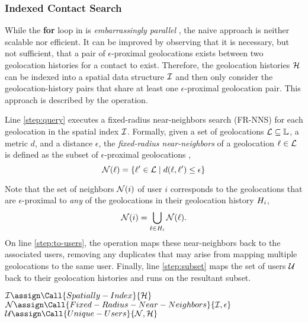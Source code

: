 \subsubsection{Indexed Contact Search}
While the \textbf{for} loop in  is \emph{embarrassingly parallel} \cite[p. 14]{Herlihy2012}, the naive approach is neither scalable nor efficient. It can be improved by observing that it is necessary, but not sufficient, that a pair of $\epsilon$\hyp{}proximal geolocations exists between two geolocation histories for a contact to exist. Therefore, the geolocation histories $\mathcal{H}$ can be indexed into a spatial data structure $\mathcal{I}$ \cite{Mokbel2003, Dinh2010, Mahmood2019} and then only consider the geolocation\hyp{}history pairs that share at least one $\epsilon$\hyp{}proximal geolocation pair. This approach is described by the  operation.

Line \ref{step:query} executes a fixed\hyp{}radius near\hyp{}neighbors search (FR-NNS) \cite{Bentley1975, Brin1995} for each geolocation in the spatial index $\mathcal{I}$. Formally, given a set of geolocations $\mathcal{L} \subseteq \mathbb{L}$, a metric $d$, and a distance $\epsilon$, the \emph{fixed\hyp{}radius near\hyp{}neighbors} of a geolocation $\ell \in \mathcal{L}$ is defined as the subset of $\epsilon$-proximal geolocations \cite{Brin1995},
	\begin{equation*}
		\mathcal{N}(\ell) = \{\ell' \in \mathcal{L} \mid d(\ell, \ell') \leq \epsilon\}
	\end{equation*}

Note that the set of neighbors $\mathcal{N}(i)$ of user $i$ corresponds to the geolocations that are $\epsilon$\hyp{}proximal to \emph{any} of the geolocations in their geolocation history $H_i$,
	\begin{equation*}
		\mathcal{N}(i) = \bigcup_{\ell \in H_i} \mathcal{N}(\ell).
	\end{equation*}
On line \ref{step:to-users}, the operation  maps these near-neighbors back to the associated users, removing any duplicates that may arise from mapping multiple geolocations to the same user. Finally, line \ref{step:subset} maps the set of users $\mathcal{U}$ back to their geolocation histories and runs  on the resultant subset.
	\begin{algorithm}[ht!]
	\begin{algorithmic}[1]
		\State $\sindex \assign \Call{Spatially-Index}{\histories}$
		\State $\query \assign \Call{Fixed-Radius-Near-Neighbors}{\sindex, \epsilon}$ \label{step:query}
		\State $\users \assign \Call{Unique-Users}{\query, \histories}$ \label{step:to-users}
		\State \Return {} \label{step:subset}
	\end{algorithmic}
	\end{algorithm}

